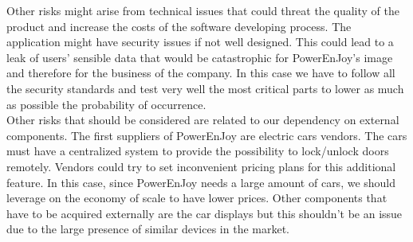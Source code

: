 Other risks might arise from technical issues that could threat the quality of the product and increase the costs of the software developing process.
The application might have security issues if not well designed. This could lead to a leak of users' sensible data that would be catastrophic for PowerEnJoy's image and therefore for the business of the company. In this case we have to follow all the security standards and test very well the most critical parts to lower as much as possible the probability of occurrence.\\
Other risks that should be considered are related to our dependency on external components. The first suppliers of PowerEnJoy are electric cars vendors. The cars must have a centralized system to provide the possibility to lock/unlock doors remotely. Vendors could try to set inconvenient pricing plans for this additional feature. In this case, since PowerEnJoy needs a large amount of cars, we should leverage on the economy of scale to have lower prices.
Other components that have to be acquired externally are the car displays but this shouldn't be an issue due to the large presence of similar devices in the market.

